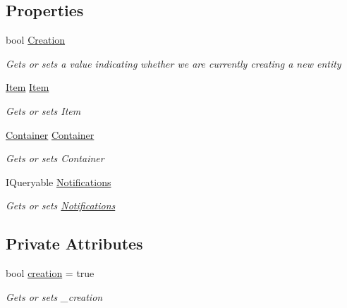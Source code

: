 \subsection*{Properties}
\begin{DoxyCompactItemize}
\item 
bool \mbox{\hyperlink{class_gtd_app_1_1_console_1_1_views_1_1_containers_1_1_items_1_1_manage_item_view_a05b4199037312f1101a7be55c94adcec}{Creation}}
\begin{DoxyCompactList}\small\item\em Gets or sets a value indicating whether we are currently creating a new entity \end{DoxyCompactList}\item 
\mbox{\hyperlink{class_gtd_app_1_1_data_1_1_item}{Item}} \mbox{\hyperlink{class_gtd_app_1_1_console_1_1_views_1_1_containers_1_1_items_1_1_manage_item_view_aaa4bbac56560e6970f77e7bc520a8f2f}{Item}}
\begin{DoxyCompactList}\small\item\em Gets or sets Item \end{DoxyCompactList}\item 
\mbox{\hyperlink{class_gtd_app_1_1_data_1_1_container}{Container}} \mbox{\hyperlink{class_gtd_app_1_1_console_1_1_views_1_1_containers_1_1_items_1_1_manage_item_view_a9bef7e67d2644806cb6690bccfb39fc1}{Container}}
\begin{DoxyCompactList}\small\item\em Gets or sets Container \end{DoxyCompactList}\item 
I\+Queryable \mbox{\hyperlink{class_gtd_app_1_1_console_1_1_views_1_1_containers_1_1_items_1_1_manage_item_view_a4a65e1259ef77380c72f051305a32de4}{Notifications}}
\begin{DoxyCompactList}\small\item\em Gets or sets \mbox{\hyperlink{namespace_gtd_app_1_1_console_1_1_views_1_1_notifications}{Notifications}} \end{DoxyCompactList}\end{DoxyCompactItemize}
\subsection*{Private Attributes}
\begin{DoxyCompactItemize}
\item 
bool \mbox{\hyperlink{class_gtd_app_1_1_console_1_1_views_1_1_containers_1_1_items_1_1_manage_item_view_a82cdf445ec61a599ff85b8a07da45d2f}{creation}} = true
\begin{DoxyCompactList}\small\item\em Gets or sets \+\_\+creation \end{DoxyCompactList}\end{DoxyCompactItemize}
